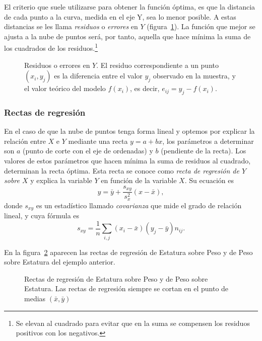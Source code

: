 El criterio que suele utilizarse para obtener la función óptima, es que la distancia
de cada punto a la curva, medida en el eje Y, sea lo menor posible. A estas distancias se les
llama \emph{residuos} o \emph{errores} en $Y$ (figura~\ref{g:residuos}). La función
que mejor se ajusta a la nube de puntos será, por tanto, aquella que hace mínima la
suma de los cuadrados de los residuos.\footnote{Se elevan al cuadrado para evitar que en la suma se compensen los residuos positivos con los negativos.}

\begin{figure}[h!]
  \centering
  \scalebox{0.8}{}
  \caption{Residuos o errores en $Y$. El residuo correspondiente a un punto $(x_i,y_j)$
  es la diferencia entre el valor $y_j$ observado en la muestra, y el valor
  teórico del modelo $f(x_i)$, es decir, $e_{ij}=y_j-f(x_i)$.}\label{g:residuos}
\end{figure}

\subsubsection{Rectas de regresión}

En el caso de que la nube de puntos tenga forma lineal y optemos por explicar la
relación entre $X$ e $Y$ mediante una recta $y=a+bx$, los parámetros a
determinar son $a$ (punto de corte con el eje de ordenadas) y $b$ (pendiente de
la recta). Los valores de estos parámetros que hacen mínima la suma de
residuos al cuadrado, determinan la recta óptima. Esta recta se conoce como \emph{recta de
regresión de $Y$ sobre $X$} y explica la variable $Y$ en función de la variable
$X$. Su ecuación es
\[ y= \bar{y}+\frac{s_{xy}}{s_x^2}(x-\bar{x}),\]
donde $s_{xy}$ es un estadístico llamado \emph{covarianza} que mide el grado de relación lineal, y cuya fórmula es
\[s_{xy}=\frac{1}{n}\sum_{i,j} (x_i-\bar{x}) (y_j-\bar{y}) n_{ij}.\]

\begin{ejemplo}
En la figura~\ref{g:rectas-estatura-peso} aparecen las rectas de regresión de Estatura sobre Peso y de Peso sobre Estatura del ejemplo anterior.

\begin{figure}[h!]
  \centering
  \scalebox{0.8}{}
  \caption{Rectas de regresión de Estatura sobre Peso y de Peso sobre Estatura. Las rectas de regresión siempre se cortan en el punto de medias $(\bar x, \bar y)$}\label{g:rectas-estatura-peso}
\end{figure}
\end{ejemplo}

